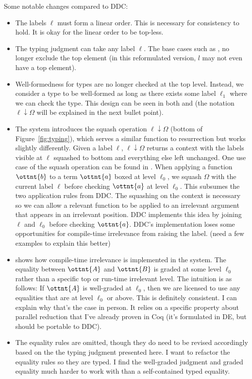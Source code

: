 \documentclass{article}
\begin{document}
Some notable changes compared to DDC:
\begin{itemize}
\item The labels $\ell$ must form a linear order. This is necessary
for consistency to hold. It is okay for the linear order to be
top-less.
\item The typing judgment can take any label $\ell$. The base cases
such as ,  no longer exclude the top element
(in this reformulated version, $l$ may not even have a top
element).
\item Well-formedness for types are no longer checked at the top
level.  Instead, we consider a type to be well-formed as long as there
exists some label $\ell_{{\mathrm{1}}}$ where we can check the type. This design
can be seen in both  and  (the
notation $ \ell  \downarrow  \Omega $ will be explained in the next bullet point).
\item The system introduces the squash operation $ \ell  \downarrow  \Omega $ (bottom of
Figure~\ref{fig:typing}), which serves a similar function to
resurrection but works slightly differently. Given a label $\ell$,
$ \ell  \downarrow  \Omega $ returns a context with the labels visible at $\ell$
squashed to bottom and everything else left unchanged. One use case of
the squash operation can be found in . When applying
a function $\ottnt{b}$ to a term $\ottnt{a}$ boxed at level $\ell_{{\mathrm{0}}}$,
we squash $\Omega$ with the current label $\ell$ before checking
$\ottnt{a}$ at level $\ell_{{\mathrm{0}}}$. This subsumes the two application rules
from DDC. The squashing on the context is necessary so we can allow a
relevant function to be applied to an irrelevant argument that appears
in an irrelevant position. DDC implements this idea by joining $\ell$
and $\ell_{{\mathrm{0}}}$ before checking $\ottnt{a}$. DDC's implementation loses
some opportunities for compile-time irrelevance from raising the
label. (need a few examples to explain this better)
\item {} shows how compile-time irrelevance is implemented
  in the system. The equality between $\ottnt{A}$ and $\ottnt{B}$ is graded at
  some level $\ell_{{\mathrm{0}}}$ rather than a specific top or run-time
  irrelevant level. The intuition is as follows: If $\ottnt{A}$ is
  well-graded at $\ell_{{\mathrm{0}}}$, then we are licensed to use any equalities
  that are at level $\ell_{{\mathrm{0}}}$ or above. This is definitely
  consistent. I can explain why that's the case in person. It relies
  on a specific property about parallel reduction that I've already
  proven in Coq (it's formulated in DE, but should be portable to DDC).
\item The equality rules are omitted, though they do need to be
  revised accordingly based on the the typing judgment presented
  here. I want to refactor the equality rules so they are typed. I
  find the well-graded judgment and graded equality much harder to
  work with than a self-contained typed equality.
\end{itemize}
\end{document}
